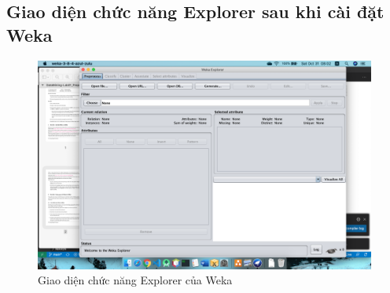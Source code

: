 \documentclass[a4paper, 12pt]{article}
\begin{document}
\subsection{Giao diện chức năng Explorer sau khi cài đặt Weka}
\begin{figure}[H]
    \begin{center}
        \includegraphics[scale = 0.35]{./images/wekw_explorer.png}
        \caption{Giao diện chức năng Explorer của Weka}
    \end{center}
\end{figure}
\end{document}
